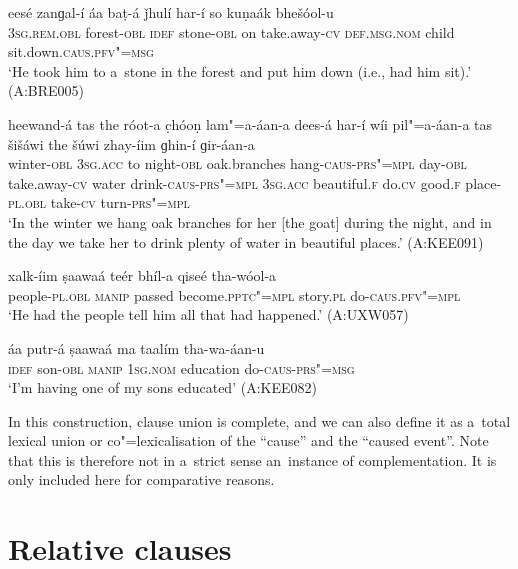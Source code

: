 \begin{exe}
\ex
\label{ex:13-184}
\gll eesé zanɡal-í áa baṭ-á ǰhulí har-í  so kuṇaák bhešóol-u \\
\textsc{3sg.rem.obl} forest-\textsc{obl} \textsc{idef} stone-\textsc{obl} on take.away-\textsc{cv} \textsc{def.msg.nom} child sit.down.\textsc{caus}.\textsc{pfv"=msg} \\
\glt `He took him to a~stone in the forest and put him down (i.e., had him sit).' (A:BRE005)

\ex
\label{ex:13-185}
\gll heewand-á tas the róot-a c̣hóoṇ  lam"=a-áan-a dees-á har-í wíi
pil"=a-áan-a tas šišáwi the šúwi zhay-íim  ɡhin-í ɡir-áan-a \\
winter-\textsc{obl}  \textsc{3sg.acc}  to night-\textsc{obl} oak.branches  hang-\textsc{caus}-\textsc{prs"=mpl} day-\textsc{obl} take.away-\textsc{cv} water  drink-\textsc{caus}-\textsc{prs"=mpl} \textsc{3sg.acc} beautiful.\textsc{f} do.\textsc{cv} good.\textsc{f} place-\textsc{pl.obl} take-\textsc{cv} turn-\textsc{prs"=mpl} \\
\glt `In the winter we hang oak branches for her [the goat] during the night, and in the day we take her to drink plenty of water in beautiful places.' (A:KEE091)

\ex
\label{ex:13-186}
\gll xalk-íim ṣaawaá teér bhíl-a qiseé  tha-wóol-a \\
people-\textsc{pl.obl} \textsc{manip} passed become.\textsc{pptc"=mpl} story.\textsc{pl} do-\textsc{caus}.\textsc{pfv"=mpl} \\
\glt `He had the people tell him all that had happened.' (A:UXW057)

\ex
\label{ex:13-187}
\gll áa putr-á ṣaawaá ma taalím tha-wa-áan-u  \\
\textsc{idef} son-\textsc{obl} \textsc{manip} \textsc{1sg.nom} education do-\textsc{caus}-\textsc{prs"=msg} \\
\glt `I'm having one of my sons educated' (A:KEE082) 
\end{exe}

In this construction, clause union is complete, and we can also define it as a~total lexical union \citep[86]{noonan2007} or co"=lexicalisation of the ``cause'' and the ``caused event''. Note that this is therefore not in a~strict sense an~instance of complementation. It is only included here for comparative reasons.


\section{Relative clauses}
\label{sec:13-6}

